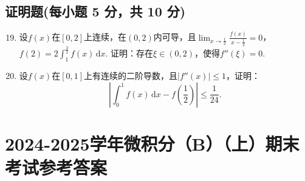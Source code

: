 \documentclass[../main.tex]{subfiles}
\begin{document}
\section{证明题(每小题 5 分，共 10 分)}
\begin{enumerate}
    \setcounter{enumi}{18}
    \item 设$f(x)$在$[0,2]$上连续，在$(0,2)$内可导，且$\lim_{x\to\frac{1}{2}}
              \frac{f(x)}{x-\frac{1}{2}}=0$，$f(2)=2\int_{1}^{\frac{3}{2}}f(x)\,\mathrm{d}x$.
          证明：存在$\xi\in(0,2)$，使得$f''(\xi)=0$.
          \vspace{13em}

    \item 设$f(x)$在$[0,1]$上有连续的二阶导数，且$|f''(x)|\leq1$，证明：
          \[
              \left|\int_{0}^{1}f(x)\,\mathrm{d}x-f\left(\frac{1}{2}\right)\right|\leq\frac{1}{24}
              .
          \]
          \vspace{13em}
\end{enumerate}

\chapter{2024-2025学年微积分（B）（上）期末考试参考答案}
\end{document}

